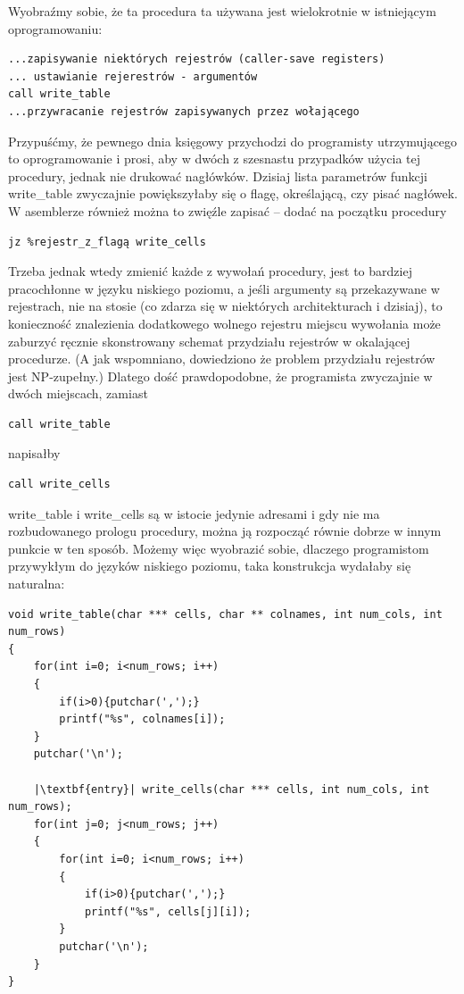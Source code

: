 Wyobraźmy sobie, że ta procedura ta używana jest wielokrotnie w istniejącym oprogramowaniu:
\begin{lstlisting}
...zapisywanie niektórych rejestrów (caller-save registers)
... ustawianie rejerestrów - argumentów
call write_table
...przywracanie rejestrów zapisywanych przez wołającego
\end{lstlisting}
Przypuśćmy, że pewnego dnia księgowy przychodzi do programisty utrzymującego to oprogramowanie i prosi, aby w dwóch z szesnastu przypadków użycia tej procedury, jednak nie drukować nagłówków. Dzisiaj lista parametrów funkcji write\_table zwyczajnie powiększyłaby się o flagę, określającą, czy pisać nagłówek. W asemblerze również można to zwięźle zapisać – dodać na początku procedury
\begin{lstlisting}
jz %rejestr_z_flagą write_cells
\end{lstlisting}
Trzeba jednak wtedy zmienić każde z wywołań procedury, jest to bardziej pracochłonne w języku niskiego poziomu, a jeśli argumenty są przekazywane w rejestrach, nie na stosie (co zdarza się w niektórych architekturach i dzisiaj), to konieczność znalezienia dodatkowego wolnego rejestru miejscu wywołania może zaburzyć ręcznie skonstrowany schemat przydziału rejestrów w okalającej procedurze. (A jak wspomniano, dowiedziono że problem przydziału rejestrów jest NP-zupełny.\cite{REGISTER_ALLOCATION_CHAITIN1981}) Dlatego dość prawdopodobne, że programista zwyczajnie w dwóch miejscach, zamiast
\begin{lstlisting}
call write_table
\end{lstlisting}
napisałby 
\begin{lstlisting}
call write_cells
\end{lstlisting}
write\_table i write\_cells są w istocie jedynie adresami i gdy nie ma rozbudowanego prologu procedury, można ją rozpocząć równie dobrze w innym punkcie w ten sposób. Możemy więc wyobrazić sobie, dlaczego programistom przywykłym do języków niskiego poziomu, taka konstrukcja wydałaby się naturalna:


\lstset{
    escapechar=|,
    breaklines=true
}
\begin{lstlisting}
void write_table(char *** cells, char ** colnames, int num_cols, int num_rows)
{
    for(int i=0; i<num_rows; i++)
    {
        if(i>0){putchar(',');}
        printf("%s", colnames[i]);
    }
    putchar('\n');
    
    |\textbf{entry}| write_cells(char *** cells, int num_cols, int num_rows);
    for(int j=0; j<num_rows; j++)
    {
        for(int i=0; i<num_rows; i++)
        {
            if(i>0){putchar(',');}
            printf("%s", cells[j][i]);
        }
        putchar('\n');
    }
}
\end{lstlisting}


